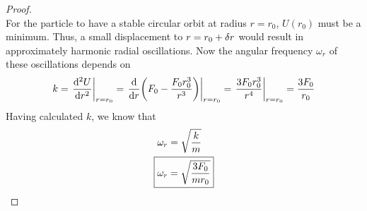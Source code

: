 \documentclass[../psets.tex]{subfiles}
\begin{document}
\begin{enumerate}
\begin{enumerate}
\begin{proof}
\begin{equation*}
            \end{equation*}
            For the particle to have a stable circular orbit at radius $r=r_0$, $U(r_0)$ must be a minimum. Thus, a small displacement to $r=r_0+\var{r}$ would result in approximately harmonic radial oscillations. Now the angular frequency $\omega_r$ of these oscillations depends on
            \begin{equation*}
                k = \eval{\dv[2]{U}{r}}_{r=r_0}
                = \eval{\dv{r}(F_0-\frac{F_0r_0^3}{r^3})}_{r=r_0}
                = \eval{\frac{3F_0r_0^3}{r^4}}_{r=r_0}
                = \frac{3F_0}{r_0}
            \end{equation*}
            Having calculated $k$, we know that
            \begin{align*}
                \omega_r &= \sqrt{\frac{k}{m}}\\
                \Aboxed{\omega_r &= \sqrt{\frac{3F_0}{mr_0}}}
            \end{align*}
        \end{proof}
    \end{enumerate}
\end{enumerate}
\end{document}
